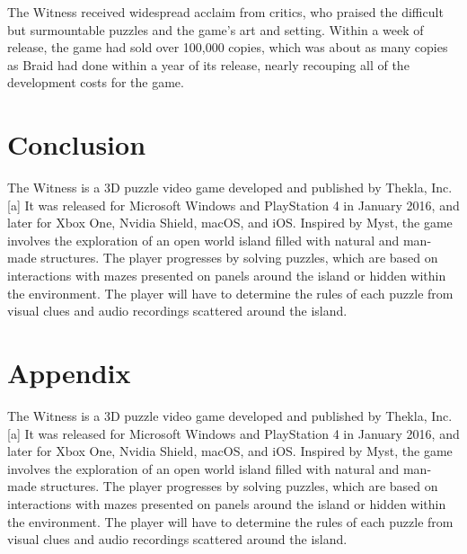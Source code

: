 \documentclass[11pt,a4paper]{scrartcl}
\begin{document}
The Witness received widespread acclaim from critics, who praised the difficult but surmountable puzzles and the game's art and setting. Within a week of release, the game had sold over 100,000 copies, which was about as many copies as Braid had done within a year of its release, nearly recouping all of the development costs for the game.

\section{Conclusion}\label{sec:conclusion}

The Witness is a 3D puzzle video game developed and published by Thekla, Inc.[a] It was released for Microsoft Windows and PlayStation 4 in January 2016, and later for Xbox One, Nvidia Shield, macOS, and iOS. Inspired by Myst, the game involves the exploration of an open world island filled with natural and man-made structures. The player progresses by solving puzzles, which are based on interactions with mazes presented on panels around the island or hidden within the environment. The player will have to determine the rules of each puzzle from visual clues and audio recordings scattered around the island.

\newpage
{}




\newpage
\appendix

\section{Appendix}\label{sec:appendix}

The Witness is a 3D puzzle video game developed and published by Thekla, Inc.[a] It was released for Microsoft Windows and PlayStation 4 in January 2016, and later for Xbox One, Nvidia Shield, macOS, and iOS. Inspired by Myst, the game involves the exploration of an open world island filled with natural and man-made structures. The player progresses by solving puzzles, which are based on interactions with mazes presented on panels around the island or hidden within the environment. The player will have to determine the rules of each puzzle from visual clues and audio recordings scattered around the island.
\end{document}
